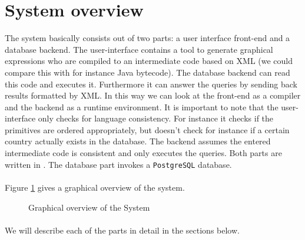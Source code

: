 \section{System overview}
The system basically consists out of two parts: a user interface front-end and
a database backend. The user-interface contains a tool to generate graphical
expressions who are compiled to an intermediate code based on XML (we could
compare this with for instance Java bytecode). The database backend can read
this code and executes it. Furthermore it can answer the queries by sending
back results formatted by XML. In this way we can look at the front-end as a
compiler and the backend as a runtime environment. It is important to note that
the user-interface only checks for language consistency. For instance it checks
if the primitives are ordered appropriately, but doesn't check for instance if
a certain country actually exists in the database. The backend assumes the
entered intermediate code is consistent and only executes the queries. Both
parts are written in \Csh{}. The database part invokes a \texttt{PostgreSQL}
database.
\paragraph{}
Figure \ref{fig:systemOverview} gives a graphical overview of the system.
\begin{figure}[hbt]
\centering
{}
\caption{Graphical overview of the System}
\label{fig:systemOverview}
\end{figure}
\paragraph{}We will describe each of the parts in detail in the sections below.